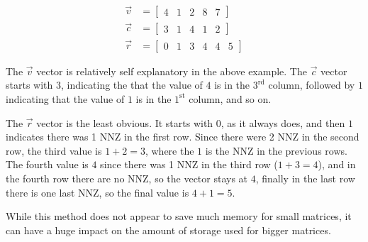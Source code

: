 \begin{align}
\vec{v} &= \begin{bmatrix} 4 & 1 & 2 & 8 & 7 \end{bmatrix} \\
\vec{c} &= \begin{bmatrix} 3 & 1 & 4 & 1 & 2 \end{bmatrix} \\
\vec{r} &= \begin{bmatrix} 0 & 1 & 3 & 4 & 4 & 5 \end{bmatrix}
\end{align}

The $\vec{v}$ vector is relatively self explanatory in the above example. The $\vec{c}$ vector starts with $3$, indicating the that the value of $4$ is in the $3^\mathrm{rd}$ column, followed by $1$ indicating that the value of $1$ is in the $1^\mathrm{st}$ column, and so on. 

The $\vec{r}$ vector is the least obvious. It starts with 0, as it always does, and then $1$ indicates there was 1 NNZ in the first row. Since there were 2 NNZ in the second row, the third value is $1 + 2 = 3$, where the $1$ is the NNZ in the previous rows. The fourth value is $4$ since there was 1 NNZ in the third row ($1+3=4$), and in the fourth row there are no NNZ, so the vector stays at $4$, finally in the last row there is one last NNZ, so the final value is $4+1=5$. 

While this method does not appear to save much memory for small matrices, it can have a huge impact on the amount of storage used for bigger matrices. 

